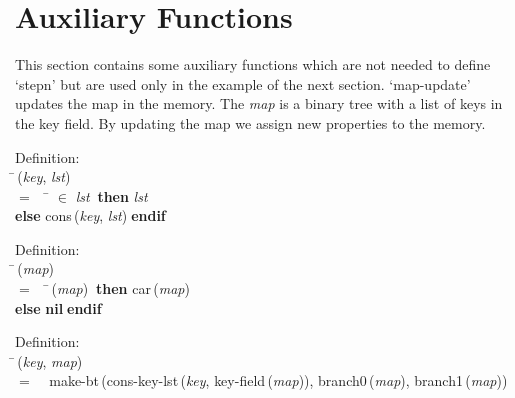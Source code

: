  \section{Auxiliary Functions}
 This section contains some auxiliary functions which are not needed
 to define `stepn' but are used only in the example of the next section.
 `map-update' updates the map in the memory.  The {\it{map\/}} is a binary tree
 with a list of keys in the key field.  By updating the map we assign 
 new properties to the memory.
\begin{tabbing}{\sc Definition}: \\  
\=\,({\it{key\/}}, {\it{lst\/}}) \\ 
$=$$\;\;\;\;$\= $\in$ {\it{lst\/}}$\;\;${\bf then }{\it{lst\/}} \\ 
{\bf else }{\rm{cons}}\,({\it{key\/}}, {\it{lst\/}})$\;${\bf  endif}\-\-
\end{tabbing}

\begin{tabbing}{\sc Definition}: \\  
\=\,({\it{map\/}}) \\ 
$=$$\;\;\;\;$\=\,({\it{map\/}})$\;\;${\bf then }{\rm{car}}\,({\it{map\/}}) \\ 
{\bf else }{\bf{nil}}$\;${\bf  endif}\-\-
\end{tabbing}

\begin{tabbing}{\sc Definition}: \\  
\=\,({\it{key\/}}, {\it{map\/}}) \\ 
$=$$\;\;\;\;${\rm{make-bt}}\,({\rm{cons-key-lst}}\,({\it{key\/}}, {\rm{key-field}}\,({\it{map\/}})), {\rm{branch0}}\,({\it{map\/}}), {\rm{branch1}}\,({\it{map\/}}))\-
\end{tabbing}

